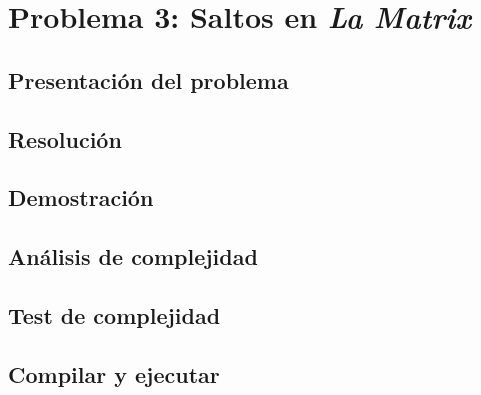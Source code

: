 \section{Problema 3: Saltos en {\it La Matrix}}

\subsection{Presentaci\'on del problema}

\subsection{Resoluci\'on}

\subsection{Demostraci\'on} 

\subsection{An\'alisis de complejidad}

\subsection{Test de complejidad}

\subsection{Compilar y ejecutar}

